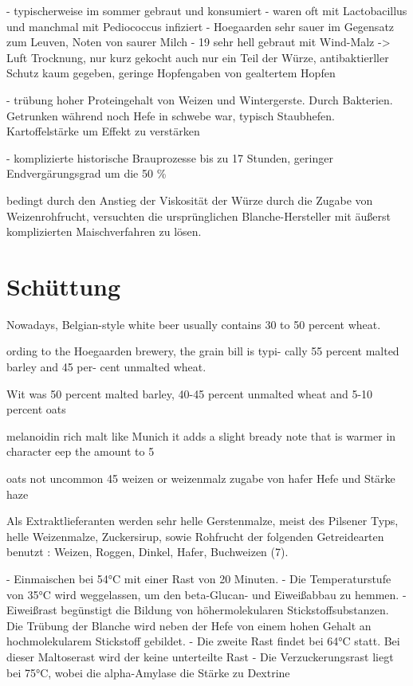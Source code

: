 \documentclass[a4paper,parskip=half]{scrartcl}
\begin{document}
\parencite[38]{Hieronymus2010}
- typischerweise im sommer gebraut und konsumiert
- waren oft mit Lactobacillus und manchmal mit Pediococcus infiziert
- Hoegaarden sehr sauer im Gegensatz zum Leuven, Noten von saurer Milch
- 19 sehr hell gebraut mit Wind-Malz -> Luft Trocknung, nur kurz gekocht
  auch nur ein Teil der Würze, antibaktierller Schutz kaum gegeben,
  geringe Hopfengaben von gealtertem Hopfen

\parencite[39]{Hieronymus2010}
- trübung hoher Proteingehalt von Weizen und Wintergerste.
 Durch Bakterien. Getrunken während noch Hefe in schwebe war,
 typisch Staubhefen. Kartoffelstärke um Effekt zu verstärken

- komplizierte historische Brauprozesse bis zu 17 Stunden, geringer
  Endvergärungsgrad um die 50 \%



\parencite[9]{Strottner1999}
bedingt durch den Anstieg der Viskosität der Würze durch die
Zugabe von Weizenrohfrucht, versuchten die ursprünglichen Blanche-Hersteller mit
äußerst komplizierten Maischverfahren zu lösen.




\section*{Schüttung}

\parencite[45]{Mulder2020}
Nowadays, Belgian-style white beer usually contains 30 to 50 percent wheat.


\parencite[29]{Sparrow2002}
ording to the
Hoegaarden brewery, the grain bill is typi-
cally 55 percent malted barley and 45 per-
cent unmalted wheat.

\parencite[28]{Sparrow2002}
Wit was 50 percent malted barley, 40-45 percent unmalted wheat and 5-10 percent oats

\parencite{Zainasheff2007}
melanoidin rich malt like Munich it adds a slight bready note that is warmer in character
eep the amount to 5%

\parencite[46]{Roncoroni2018}
oats not uncommon
45 weizen or weizenmalz  
zugabe von hafer
Hefe und Stärke haze

\parencite[14]{Strottner1999}
Als Extraktlieferanten werden sehr helle Gerstenmalze, meist des Pilsener Typs,
helle Weizenmalze, Zuckersirup, sowie Rohfrucht der folgenden Getreidearten
benutzt : Weizen, Roggen, Dinkel, Hafer, Buchweizen (7).

\parencite[16]{Strottner1999}
- Einmaischen bei 54°C mit einer Rast von 20 Minuten.
- Die Temperaturstufe von 35°C wird weggelassen, um den beta-Glucan- und Eiweißabbau zu hemmen. 
- Eiweißrast begünstigt die Bildung von höhermolekularen Stickstoffsubstanzen.
  Die Trübung der Blanche wird neben der Hefe von einem hohen Gehalt an
  hochmolekularem Stickstoff gebildet.
- Die zweite Rast findet bei 64°C statt. Bei dieser Maltoserast wird der
   keine  unterteilte Rast
- Die Verzuckerungsrast liegt bei 75°C, wobei die alpha-Amylase die Stärke zu Dextrine
\end{document}
